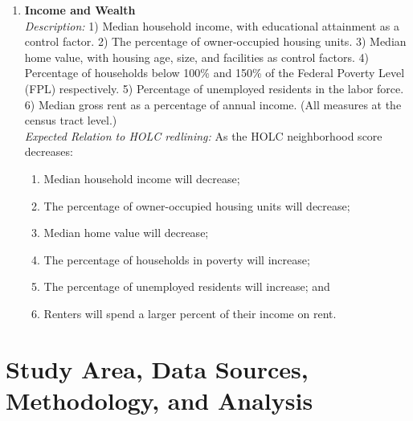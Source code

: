 \documentclass[paper=letter, fontsize=12pt]{scrartcl} %
\begin{document}
\begin{enumerate}
	\item \textbf{Income and Wealth}\\
	\textit{Description:} 1) Median household income, with educational attainment as a control factor. 2) The percentage of owner-occupied housing units. 3) Median home value, with housing age, size, and facilities as control factors. 4) Percentage of households below 100\% and 150\% of the Federal Poverty Level (FPL) respectively. 5) Percentage of unemployed residents in the labor force. 6) Median gross rent as a percentage of annual income. (All measures at the census tract level.)\\
	\textit{Expected Relation to HOLC redlining:} As the HOLC neighborhood score decreases:
	\begin{enumerate}
		\item Median household income will decrease;
		\item The percentage of owner-occupied housing units will decrease;
		\item Median home value will decrease;
		\item The percentage of households in poverty will increase;
		\item The percentage of unemployed residents will increase; and
		\item Renters will spend a larger percent of their income on rent.
	\end{enumerate}
\end{enumerate}

\section{Study Area, Data Sources, Methodology, and Analysis}
\end{document}

